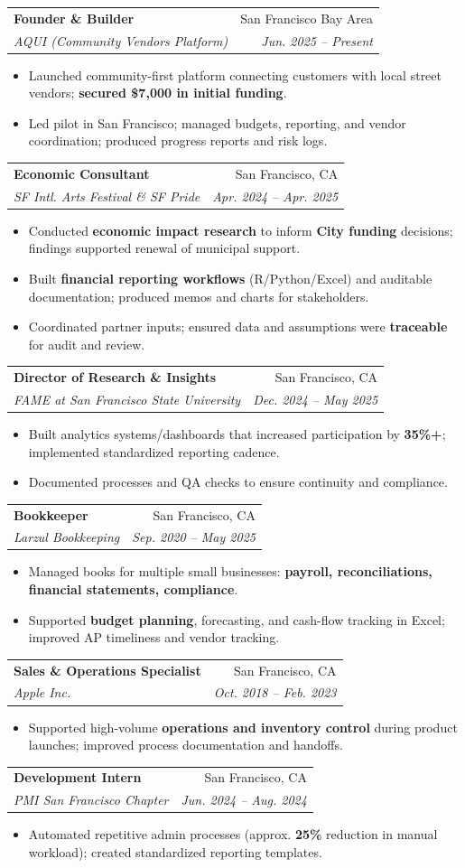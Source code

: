\documentclass[letterpaper,11pt]{article}
\makeatletter
\newcommand{\resumeItem}[1]{\item\small{#1 \vspace{-2pt}}}
\newcommand{\resumeSubheading}[4]{
  \vspace{-2pt}\item
    \begin{tabular*}{0.97\textwidth}[t]{l@{\extracolsep{\fill}}r}
      \textbf{#1} & #2 \\
      \textit{\small #3} & \textit{\small #4} \\
    \end{tabular*}\vspace{-7pt}
}
\newcommand{\resumeItemListStart}{\begin{itemize}[leftmargin=0.18in]\setlength\itemsep{2pt}}
\newcommand{\resumeItemListEnd}{\end{itemize}\vspace{-5pt}}
\makeatother
\begin{document}
  \resumeSubheading
    {Founder \& Builder}{San Francisco Bay Area}
    {AQUI (Community Vendors Platform)}{Jun. 2025 -- Present}
    \resumeItemListStart
      \resumeItem{Launched community-first platform connecting customers with local street vendors; \textbf{secured \$7{,}000 in initial funding}.}
      \resumeItem{Led pilot in San Francisco; managed budgets, reporting, and vendor coordination; produced progress reports and risk logs.}
    \resumeItemListEnd

  \resumeSubheading
    {Economic Consultant}{San Francisco, CA}
    {SF Intl. Arts Festival \& SF Pride}{Apr. 2024 -- Apr. 2025}
    \resumeItemListStart
      \resumeItem{Conducted \textbf{economic impact research} to inform \textbf{City funding} decisions; findings supported renewal of municipal support.}
      \resumeItem{Built \textbf{financial reporting workflows} (R/Python/Excel) and auditable documentation; produced memos and charts for stakeholders.}
      \resumeItem{Coordinated partner inputs; ensured data and assumptions were \textbf{traceable} for audit and review.}
    \resumeItemListEnd

  \resumeSubheading
    {Director of Research \& Insights}{San Francisco, CA}
    {FAME at San Francisco State University}{Dec. 2024 -- May 2025}
    \resumeItemListStart
      \resumeItem{Built analytics systems/dashboards that increased participation by \textbf{35\%+}; implemented standardized reporting cadence.}
      \resumeItem{Documented processes and QA checks to ensure continuity and compliance.}
    \resumeItemListEnd

  \resumeSubheading
    {Bookkeeper}{San Francisco, CA}
    {Larzul Bookkeeping}{Sep. 2020 -- May 2025}
    \resumeItemListStart
      \resumeItem{Managed books for multiple small businesses: \textbf{payroll, reconciliations, financial statements, compliance}.}
      \resumeItem{Supported \textbf{budget planning}, forecasting, and cash-flow tracking in Excel; improved AP timeliness and vendor tracking.}
    \resumeItemListEnd

  \resumeSubheading
    {Sales \& Operations Specialist}{San Francisco, CA}
    {Apple Inc.}{Oct. 2018 -- Feb. 2023}
    \resumeItemListStart
      \resumeItem{Supported high-volume \textbf{operations and inventory control} during product launches; improved process documentation and handoffs.}
    \resumeItemListEnd

  \resumeSubheading
    {Development Intern}{San Francisco, CA}
    {PMI San Francisco Chapter}{Jun. 2024 -- Aug. 2024}
    \resumeItemListStart
      \resumeItem{Automated repetitive admin processes (approx. \textbf{25\%} reduction in manual workload); created standardized reporting templates.}
    \resumeItemListEnd
\end{document}
